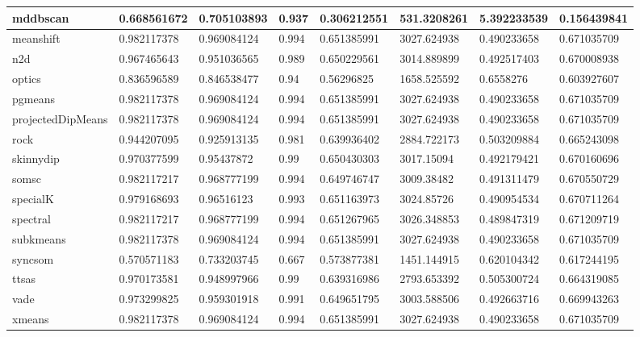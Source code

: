 \begin{table}[H]
\begin{tabular}{|l|l|l|l|l|l|l|l|}
\hline
mddbscan & 0.668561672 & 0.705103893 & 0.937 & 0.306212551 & 531.3208261 & 5.392233539 & 0.156439841 \\
\hline
meanshift & 0.982117378 & 0.969084124 & 0.994 & 0.651385991 & 3027.624938 & 0.490233658 & 0.671035709 \\
\hline
n2d & 0.967465643 & 0.951036565 & 0.989 & 0.650229561 & 3014.889899 & 0.492517403 & 0.670008938 \\
\hline
optics & 0.836596589 & 0.846538477 & 0.94 & 0.56296825 & 1658.525592 & 0.6558276 & 0.603927607 \\
\hline
pgmeans & 0.982117378 & 0.969084124 & 0.994 & 0.651385991 & 3027.624938 & 0.490233658 & 0.671035709 \\
\hline
projectedDipMeans & 0.982117378 & 0.969084124 & 0.994 & 0.651385991 & 3027.624938 & 0.490233658 & 0.671035709 \\
\hline
rock & 0.944207095 & 0.925913135 & 0.981 & 0.639936402 & 2884.722173 & 0.503209884 & 0.665243098 \\
\hline
skinnydip & 0.970377599 & 0.95437872 & 0.99 & 0.650430303 & 3017.15094 & 0.492179421 & 0.670160696 \\
\hline
somsc & 0.982117217 & 0.968777199 & 0.994 & 0.649746747 & 3009.38482 & 0.491311479 & 0.670550729 \\
\hline
specialK & 0.979168693 & 0.96516123 & 0.993 & 0.651163973 & 3024.85726 & 0.490954534 & 0.670711264 \\
\hline
spectral & 0.982117217 & 0.968777199 & 0.994 & 0.651267965 & 3026.348853 & 0.489847319 & 0.671209719 \\
\hline
subkmeans & 0.982117378 & 0.969084124 & 0.994 & 0.651385991 & 3027.624938 & 0.490233658 & 0.671035709 \\
\hline
syncsom & 0.570571183 & 0.733203745 & 0.667 & 0.573877381 & 1451.144915 & 0.620104342 & 0.617244195 \\
\hline
ttsas & 0.970173581 & 0.948997966 & 0.99 & 0.639316986 & 2793.653392 & 0.505300724 & 0.664319085 \\
\hline
vade & 0.973299825 & 0.959301918 & 0.991 & 0.649651795 & 3003.588506 & 0.492663716 & 0.669943263 \\
\hline
xmeans & 0.982117378 & 0.969084124 & 0.994 & 0.651385991 & 3027.624938 & 0.490233658 & 0.671035709 \\
\hline
\end{tabular}
\end{table}

\clearpage

